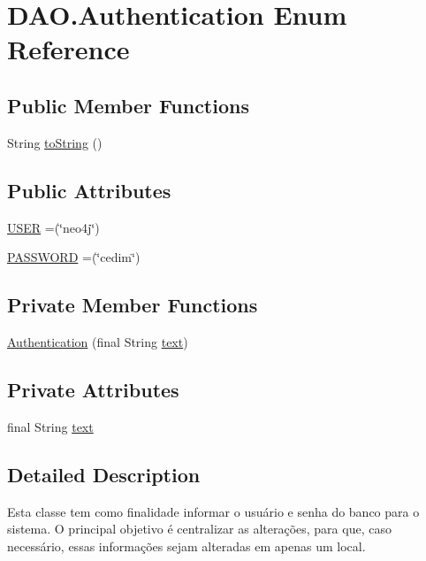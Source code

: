 \hypertarget{enumDAO_1_1Authentication}{}\section{D\+A\+O.\+Authentication Enum Reference}
\label{enumDAO_1_1Authentication}
\subsection*{Public Member Functions}
\begin{DoxyCompactItemize}
\item 
String \hyperlink{enumDAO_1_1Authentication_aee2343f1f01c93f403d8a768bfb6c3ab}{to\+String} ()
\end{DoxyCompactItemize}
\subsection*{Public Attributes}
\begin{DoxyCompactItemize}
\item 
\hyperlink{enumDAO_1_1Authentication_a5f441343b3dc00f97af7f7317e6cde41}{U\+S\+ER} =(\char`\"{}neo4j\char`\"{})
\item 
\hyperlink{enumDAO_1_1Authentication_acd4baefc303c56d134d8ee3b8cec2b7a}{P\+A\+S\+S\+W\+O\+RD} =(\char`\"{}cedim\char`\"{})
\end{DoxyCompactItemize}
\subsection*{Private Member Functions}
\begin{DoxyCompactItemize}
\item 
\hyperlink{enumDAO_1_1Authentication_ae2aa2fbece2d43b0558d014e074af952}{Authentication} (final String \hyperlink{enumDAO_1_1Authentication_ad4204da02a05a24b88a131a38ab8af2a}{text})
\end{DoxyCompactItemize}
\subsection*{Private Attributes}
\begin{DoxyCompactItemize}
\item 
final String \hyperlink{enumDAO_1_1Authentication_ad4204da02a05a24b88a131a38ab8af2a}{text}
\end{DoxyCompactItemize}


\subsection{Detailed Description}
Esta classe tem como finalidade informar o usuário e senha do banco para o sistema. O principal objetivo é centralizar as alterações, para que, caso necessário, essas informações sejam alteradas em apenas um local.

